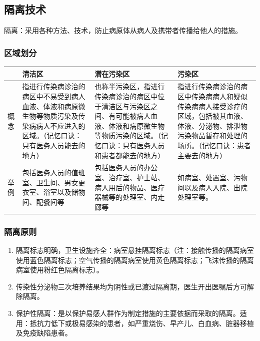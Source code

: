 \documentclass[11pt, a4paper]{ctexart}
\begin{document}
\subsection{隔离技术}
隔离：采用各种方法、技术，防止病原体从病人及携带者传播给他人的措施。

\subsubsection{区域划分}
\begin{table}[htbp]
\centering
\begin{tabular}{|p{2.5cm}|p{4cm}|p{4cm}|p{4cm}|}
\hline
 & \textbf{清洁区} & \textbf{潜在污染区} & \textbf{污染区} \\
\hline
概念 & 指进行传染病诊治的病区中不易受到病人血液、体液和病原微生物等物质污染及传染病病人不应进入的区域。（记忆口诀：只有医务人员能去的地方） & 也称半污染区，指进行传染病诊治的病区中位于清洁区与污染区之间、有可能被病人血液、体液和病原微生物等物质污染的区域。（记忆口诀：只有医务人员和患者都能去的地方） & 指进行传染病诊治的病区中传染病病人和疑似传染病病人接受诊疗的区域，包括被其血液、体液、分泌物、排泄物污染物品暂存和处理的场所。（记忆口诀：患者主要去的地方） \\
\hline
举例 & 包括医务人员的值班室、卫生间、男女更衣室、浴室以及储物间、配餐间等 & 包括医务人员的办公室、治疗室、护士站、病人用后的物品、医疗器械等的处理室、内走廊等 & 如病室、处置室、污物间以及病人入院、出院处理室等。 \\
\hline
\end{tabular}
\end{table}

\subsubsection{隔离原则}
\begin{enumerate}
    \item 隔离标志明确，卫生设施齐全：病室悬挂隔离标志（注：接触传播的隔离病室使用蓝色隔离标志；空气传播的隔离病室使用黄色隔离标志；飞沫传播的隔离病室使用粉红色隔离标志）。
    \item 传染性分泌物三次培养结果均为阴性或已渡过隔离期，医生开出医嘱后方可解除隔离。
    \item 保护性隔离：是以保护易感人群作为制定措施的主要依据而采取的隔离。适用：抵抗力低下或极易感染的患者，如严重烧伤、早产儿、白血病、脏器移植及免疫缺陷患者。
\end{enumerate}
\end{document}

